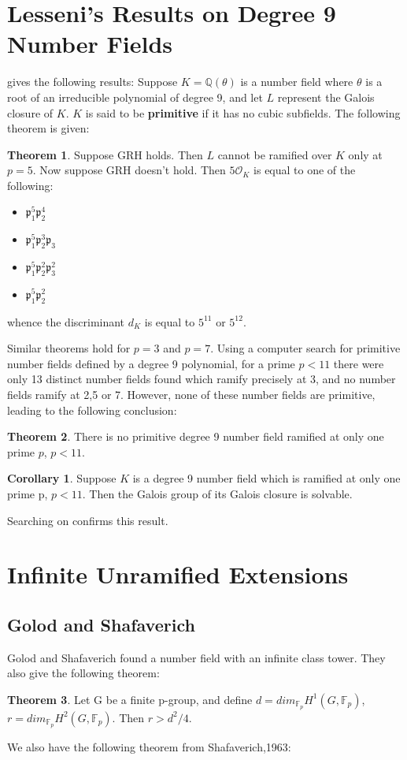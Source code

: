 \documentclass[12pt]{extarticle}
\newcommand{\<}{\langle}
\renewcommand{\>}{\rangle}
\theoremstyle{definition}
\newtheorem{theorem}{Theorem}
\newtheorem{corollary}{Corollary}
\begin{document}
\section{Lesseni's Results on Degree 9 Number Fields}
\cite{LESSENI} gives the following results:
Suppose $K=\mathbb{Q}(\theta)$ is a number field where $\theta$ is a root of an irreducible polynomial of degree 9, and let $L$ represent the Galois closure of $K$. $K$ is said to be \textbf{primitive} if it has no cubic subfields. The following theorem is given:
 \begin{theorem}
    Suppose GRH holds. Then $L$ cannot be ramified over $K$ only at $p=5$. Now suppose GRH doesn't hold. Then $5\mathcal{O}_K$ is equal to one of the following: \begin{itemize}
        \item $\mathfrak{p}_1^5\mathfrak{p}_2^4$
        \item $\mathfrak{p}_1^5\mathfrak{p}_2^3\mathfrak{p}_3$
        \item $\mathfrak{p}_1^5\mathfrak{p}_2^2\mathfrak{p}_3^2$
        \item  $\mathfrak{p}_1^5\mathfrak{p}_2^2$
    \end{itemize}
    whence the discriminant $d_K$ is equal to $5^{11}$ or $5^{12}$. 
\end{theorem}
Similar theorems hold for $p=3$ and $p=7$.  Using a computer search for primitive number fields defined by a degree 9 polynomial, for a prime $p<11$ there were only 13 distinct number fields found which ramify precisely at 3, and no number fields ramify at 2,5 or 7. However, none of these number fields are primitive, leading to the following conclusion:
\begin{theorem}
    There is no primitive degree 9 number field ramified at only one prime $p$, $p<11$.
\end{theorem}
\begin{corollary}
 Suppose $K$ is a degree 9 number field which is ramified at only one prime p, $p<11$. Then the Galois group of its Galois closure is solvable. 
\end{corollary}
Searching on \cite{JONE2} confirms this result. 

\section{Infinite Unramified Extensions}

\subsection{Golod and Shafaverich}
Golod and Shafaverich \cite{GOLO} found a number field with an infinite class tower. They also give the following theorem:\begin{theorem}
    Let G be a finite p-group, and define $d=dim_{\mathbb{F}_{p}}H^1(G,\mathbb{F}_p)$, $r=dim_{\mathbb{F}_{p}}H^2(G,\mathbb{F}_p)$. 
    Then $r>d^2/4$.
\end{theorem}
We also have the following theorem from Shafaverich,1963:
\end{document}
